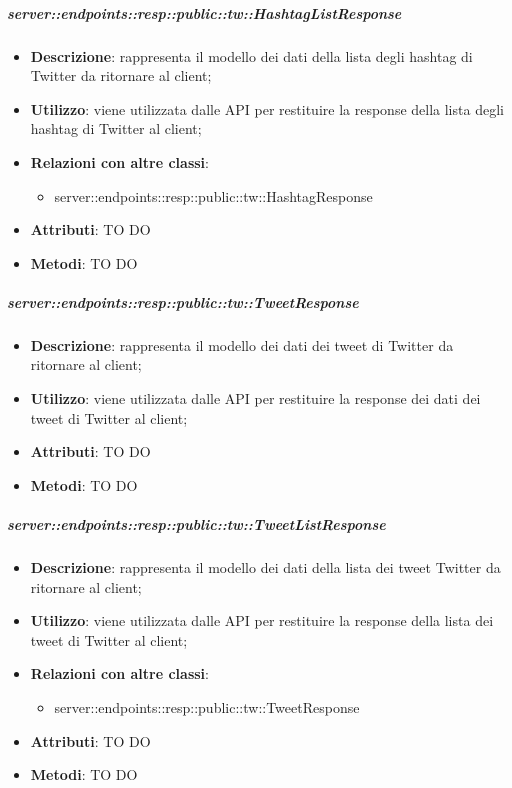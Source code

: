     \subparagraph{server::endpoints::resp::public::tw::HashtagListResponse} %
    \label{subp:bdsm_app_server_endpoints_resp_public_tw_hashtaglistresponse}
    \begin{itemize}
      \item \textbf{Descrizione}: rappresenta il modello dei dati della lista degli hashtag di Twitter da ritornare al client;
      \item \textbf{Utilizzo}: viene utilizzata dalle API per restituire la response della lista degli hashtag di Twitter al client;
      \item \textbf{Relazioni con altre classi}:
        \begin{itemize}
          \item server::endpoints::resp::public::tw::HashtagResponse
        \end{itemize}
	  \item \textbf{Attributi}: TO DO
	  \item \textbf{Metodi}: TO DO
      \end{itemize}

    \subparagraph{server::endpoints::resp::public::tw::TweetResponse} %
    \label{subp:bdsm_app_server_endpoints_resp_public_tw_tweetresponse}
    \begin{itemize}
      \item \textbf{Descrizione}: rappresenta il modello dei dati dei tweet di Twitter da ritornare al client;
      \item \textbf{Utilizzo}: viene utilizzata dalle API per restituire la response dei dati dei tweet di Twitter al client;
      
	  \item \textbf{Attributi}: TO DO
	  \item \textbf{Metodi}: TO DO
    \end{itemize}

    \subparagraph{server::endpoints::resp::public::tw::TweetListResponse} %
    \label{subp:bdsm_app_server_endpoints_resp_public_tw_tweetlistresponse}
    \begin{itemize}
      \item \textbf{Descrizione}: rappresenta il modello dei dati della lista dei tweet Twitter da ritornare al client;
      \item \textbf{Utilizzo}: viene utilizzata dalle API per restituire la response della lista dei tweet di Twitter al client;
      \item \textbf{Relazioni con altre classi}:
        \begin{itemize}
          \item server::endpoints::resp::public::tw::TweetResponse
        \end{itemize}
	  \item \textbf{Attributi}: TO DO
	  \item \textbf{Metodi}: TO DO
    \end{itemize}

